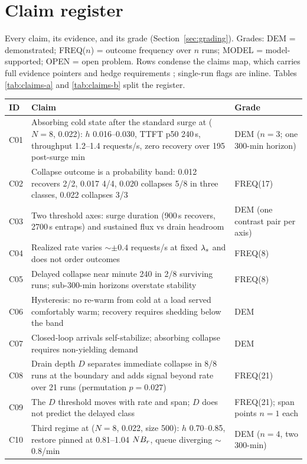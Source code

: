 \section{Claim register}
\label{sec:claims}

Every claim, its evidence, and its grade (Section~\ref{sec:grading}). Grades:
DEM = demonstrated; FREQ($n$) = outcome frequency over $n$ runs;
MODEL = model-supported; OPEN = open problem. Rows condense the
claims map, which carries full evidence pointers and hedge
requirements ; single-run flags are inline.
Tables \ref{tab:claims-a} and \ref{tab:claims-b} split the register.

\begin{table}[t]
\centering
\small
\begin{tabularx}{\textwidth}{@{}lXl@{}}
\toprule
ID & Claim & Grade \\
\midrule
C01 & Absorbing cold state after the standard surge at ($N{=}8$, 0.022): $h$ 0.016--0.030, TTFT p50 240\,s, throughput 1.2--1.4 requests/s, zero recovery over 195 post-surge min & DEM ($n=3$; one 300-min horizon) \\
C02 & Collapse outcome is a probability band: 0.012 recovers 2/2, 0.017 4/4, 0.020 collapses 5/8 in three classes, 0.022 collapses 3/3 & FREQ(17) \\
C03 & Two threshold axes: surge duration (900\,s recovers, 2700\,s entraps) and sustained flux vs drain headroom & DEM (one contrast pair per axis) \\
C04 & Realized rate varies $\sim\pm0.4$ requests/s at fixed $\lambda_s$ and does not order outcomes & FREQ(8) \\
C05 & Delayed collapse near minute 240 in 2/8 surviving runs; sub-300-min horizons overstate stability & FREQ(8) \\
C06 & Hysteresis: no re-warm from cold at a load served comfortably warm; recovery requires shedding below the band & DEM \\
C07 & Closed-loop arrivals self-stabilize; absorbing collapse requires non-yielding demand & DEM \\
C08 & Drain depth $D$ separates immediate collapse in 8/8 runs at the boundary and adds signal beyond rate over 21 runs (permutation $p = 0.027$) & FREQ(21) \\
C09 & The $D$ threshold moves with rate and span; $D$ does not predict the delayed class & FREQ(21); span points $n=1$ each \\
C10 & Third regime at ($N{=}8$, 0.022, size 500): $h$ 0.70--0.85, restore pinned at 0.81--1.04 $N B_r$, queue diverging $\sim$0.8/min & DEM ($n=4$, two 300-min) \\

\end{tabularx}
\end{table}
